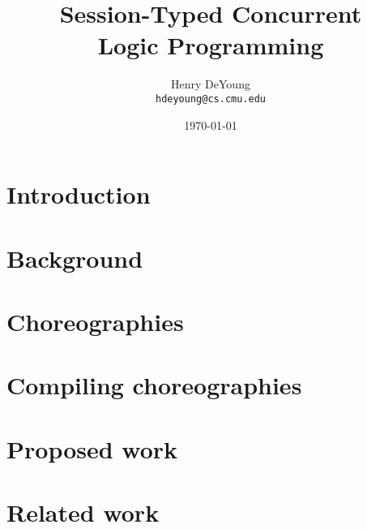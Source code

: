 \documentclass{article}
\begin{document}
\title{Session-Typed Concurrent\\Logic Programming}
\author{Henry DeYoung\\\texttt{hdeyoung@cs.cmu.edu}}
\date{\today}
\maketitle

\begin{abstract}
\end{abstract}

\section{Introduction}\label{sec:introduction}



\section{Background}\label{sec:background}



\section{Choreographies}\label{sec:choreographies}



\section{Compiling choreographies}\label{sec:compile-choreo}



\section{Proposed work}\label{sec:extensions}



\section{Related work}\label{sec:related-work}




\printbibliography
\end{document}
